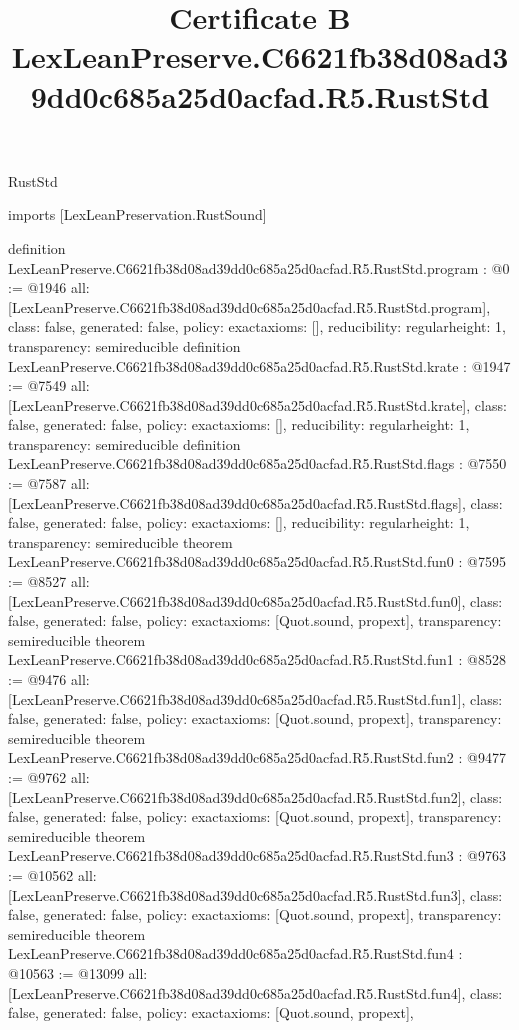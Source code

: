 \begin{lexlean}{RustStd}
\title{Certificate B LexLeanPreserve.C6621fb38d08ad39dd0c685a25d0acfad.R5.RustStd}
\begin{coremodule}
imports [LexLeanPreservation.RustSound]

definition LexLeanPreserve.C6621fb38d08ad39dd0c685a25d0acfad.R5.RustStd.program : @0 := @1946 {
  all: [LexLeanPreserve.C6621fb38d08ad39dd0c685a25d0acfad.R5.RustStd.program],
  class: false,
  generated: false,
  policy: exact{axioms: []},
  reducibility: regular{height: 1},
  transparency: semireducible
}
definition LexLeanPreserve.C6621fb38d08ad39dd0c685a25d0acfad.R5.RustStd.krate : @1947 := @7549 {
  all: [LexLeanPreserve.C6621fb38d08ad39dd0c685a25d0acfad.R5.RustStd.krate],
  class: false,
  generated: false,
  policy: exact{axioms: []},
  reducibility: regular{height: 1},
  transparency: semireducible
}
definition LexLeanPreserve.C6621fb38d08ad39dd0c685a25d0acfad.R5.RustStd.flags : @7550 := @7587 {
  all: [LexLeanPreserve.C6621fb38d08ad39dd0c685a25d0acfad.R5.RustStd.flags],
  class: false,
  generated: false,
  policy: exact{axioms: []},
  reducibility: regular{height: 1},
  transparency: semireducible
}
theorem LexLeanPreserve.C6621fb38d08ad39dd0c685a25d0acfad.R5.RustStd.fun0 : @7595 := @8527 {
  all: [LexLeanPreserve.C6621fb38d08ad39dd0c685a25d0acfad.R5.RustStd.fun0],
  class: false,
  generated: false,
  policy: exact{axioms: [Quot.sound, propext]},
  transparency: semireducible
}
theorem LexLeanPreserve.C6621fb38d08ad39dd0c685a25d0acfad.R5.RustStd.fun1 : @8528 := @9476 {
  all: [LexLeanPreserve.C6621fb38d08ad39dd0c685a25d0acfad.R5.RustStd.fun1],
  class: false,
  generated: false,
  policy: exact{axioms: [Quot.sound, propext]},
  transparency: semireducible
}
theorem LexLeanPreserve.C6621fb38d08ad39dd0c685a25d0acfad.R5.RustStd.fun2 : @9477 := @9762 {
  all: [LexLeanPreserve.C6621fb38d08ad39dd0c685a25d0acfad.R5.RustStd.fun2],
  class: false,
  generated: false,
  policy: exact{axioms: [Quot.sound, propext]},
  transparency: semireducible
}
theorem LexLeanPreserve.C6621fb38d08ad39dd0c685a25d0acfad.R5.RustStd.fun3 : @9763 := @10562 {
  all: [LexLeanPreserve.C6621fb38d08ad39dd0c685a25d0acfad.R5.RustStd.fun3],
  class: false,
  generated: false,
  policy: exact{axioms: [Quot.sound, propext]},
  transparency: semireducible
}
theorem LexLeanPreserve.C6621fb38d08ad39dd0c685a25d0acfad.R5.RustStd.fun4 : @10563 := @13099 {
  all: [LexLeanPreserve.C6621fb38d08ad39dd0c685a25d0acfad.R5.RustStd.fun4],
  class: false,
  generated: false,
  policy: exact{axioms: [Quot.sound, propext]},
}
\end{coremodule}
\end{lexlean}
